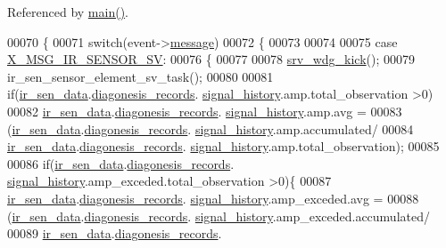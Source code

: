 Referenced by \hyperlink{a00048_source_l00080}{main()}.


\begin{DoxyCode}
00070 \{
00071     \textcolor{keywordflow}{switch}(event->\hyperlink{a00036_adf9665938515a20c283eea2c978cf80d}{message})
00072     \{
00073 
00074 
00075         \textcolor{keywordflow}{case} \hyperlink{a00023_a16b09a45fdc504b8b00d634b49c820b4}{X\_MSG\_IR\_SENSOR\_SV}:
00076         \{
00077 
00078             \hyperlink{a00067_a710d148845397582739d170341f3d3d9}{srv\_wdg\_kick}();
00079             ir\_sen\_sensor\_element\_sv\_task();
00080 
00081             \textcolor{keywordflow}{if}(\hyperlink{a00045_a73dfacb46242746440accc76c7ef710d}{ir\_sen\_data}.\hyperlink{a00023_a7ae905b560513ad201e58c2f63375030}{diagonesis\_records}.
      \hyperlink{a00017_affb63906d23cb1cb7787d61eaaedfb60}{signal\_history}.amp.total\_observation >0)
00082                 \hyperlink{a00045_a73dfacb46242746440accc76c7ef710d}{ir\_sen\_data}.\hyperlink{a00023_a7ae905b560513ad201e58c2f63375030}{diagonesis\_records}.
      \hyperlink{a00017_affb63906d23cb1cb7787d61eaaedfb60}{signal\_history}.amp.avg =
00083                         (\hyperlink{a00045_a73dfacb46242746440accc76c7ef710d}{ir\_sen\_data}.\hyperlink{a00023_a7ae905b560513ad201e58c2f63375030}{diagonesis\_records}.
      \hyperlink{a00017_affb63906d23cb1cb7787d61eaaedfb60}{signal\_history}.amp.accumulated/
00084                         \hyperlink{a00045_a73dfacb46242746440accc76c7ef710d}{ir\_sen\_data}.\hyperlink{a00023_a7ae905b560513ad201e58c2f63375030}{diagonesis\_records}.
      \hyperlink{a00017_affb63906d23cb1cb7787d61eaaedfb60}{signal\_history}.amp.total\_observation);
00085 
00086             \textcolor{keywordflow}{if}(\hyperlink{a00045_a73dfacb46242746440accc76c7ef710d}{ir\_sen\_data}.\hyperlink{a00023_a7ae905b560513ad201e58c2f63375030}{diagonesis\_records}.
      \hyperlink{a00017_affb63906d23cb1cb7787d61eaaedfb60}{signal\_history}.amp\_exceded.total\_observation >0)\{
00087                 \hyperlink{a00045_a73dfacb46242746440accc76c7ef710d}{ir\_sen\_data}.\hyperlink{a00023_a7ae905b560513ad201e58c2f63375030}{diagonesis\_records}.
      \hyperlink{a00017_affb63906d23cb1cb7787d61eaaedfb60}{signal\_history}.amp\_exceded.avg =
00088                         (\hyperlink{a00045_a73dfacb46242746440accc76c7ef710d}{ir\_sen\_data}.\hyperlink{a00023_a7ae905b560513ad201e58c2f63375030}{diagonesis\_records}.
      \hyperlink{a00017_affb63906d23cb1cb7787d61eaaedfb60}{signal\_history}.amp\_exceded.accumulated/
00089                         \hyperlink{a00045_a73dfacb46242746440accc76c7ef710d}{ir\_sen\_data}.\hyperlink{a00023_a7ae905b560513ad201e58c2f63375030}{diagonesis\_records}.

\end{DoxyCode}
